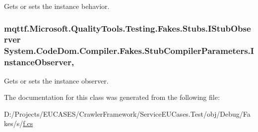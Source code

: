 Gets or sets the instance behavior.

\hypertarget{class_system_1_1_code_dom_1_1_compiler_1_1_fakes_1_1_stub_compiler_parameters_a43e60a8b7bf332635aadf87028dfb7a2}{
\subsubsection[{Instance\-Observer}]{\setlength{\rightskip}{0pt plus 5cm}mqttf.\-Microsoft.\-Quality\-Tools.\-Testing.\-Fakes.\-Stubs.\-I\-Stub\-Observer System.\-Code\-Dom.\-Compiler.\-Fakes.\-Stub\-Compiler\-Parameters.\-Instance\-Observer\hspace{0.3cm}{\ttfamily [get]}, {\ttfamily [set]}}}\label{class_system_1_1_code_dom_1_1_compiler_1_1_fakes_1_1_stub_compiler_parameters_a43e60a8b7bf332635aadf87028dfb7a2}


Gets or sets the instance observer.



The documentation for this class was generated from the following file\-:\begin{DoxyCompactItemize}
\item 
D\-:/\-Projects/\-E\-U\-C\-A\-S\-E\-S/\-Crawler\-Framework/\-Service\-E\-U\-Cases.\-Test/obj/\-Debug/\-Fakes/s/\hyperlink{s_2f_8cs}{f.\-cs}\end{DoxyCompactItemize}
